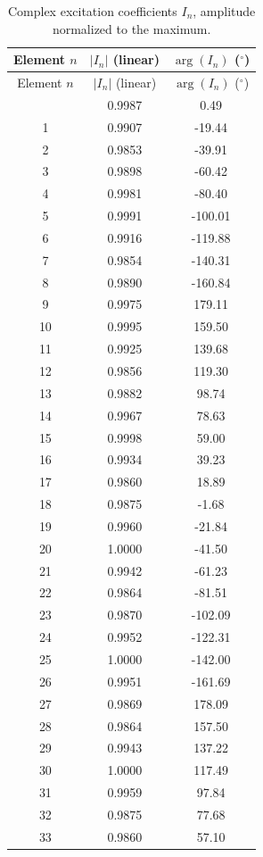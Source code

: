 \begin{longtable}{ccc}
\caption{Complex excitation coefficients $I_n$, amplitude normalized to the maximum.}\label{tab:I_vector}\\
\toprule
Element $n$ & $|I_n|$ (linear) & $\arg(I_n)$ ($^\circ$) \\
\midrule
\endfirsthead
\toprule
Element $n$ & $|I_n|$ (linear) & $\arg(I_n)$ ($^\circ$) \\
\midrule
\endhead
\bottomrule
\endfoot
0 & 0.9987 & 0.49 \\
1 & 0.9907 & -19.44 \\
2 & 0.9853 & -39.91 \\
3 & 0.9898 & -60.42 \\
4 & 0.9981 & -80.40 \\
5 & 0.9991 & -100.01 \\
6 & 0.9916 & -119.88 \\
7 & 0.9854 & -140.31 \\
8 & 0.9890 & -160.84 \\
9 & 0.9975 & 179.11 \\
10 & 0.9995 & 159.50 \\
11 & 0.9925 & 139.68 \\
12 & 0.9856 & 119.30 \\
13 & 0.9882 & 98.74 \\
14 & 0.9967 & 78.63 \\
15 & 0.9998 & 59.00 \\
16 & 0.9934 & 39.23 \\
17 & 0.9860 & 18.89 \\
18 & 0.9875 & -1.68 \\
19 & 0.9960 & -21.84 \\
20 & 1.0000 & -41.50 \\
21 & 0.9942 & -61.23 \\
22 & 0.9864 & -81.51 \\
23 & 0.9870 & -102.09 \\
24 & 0.9952 & -122.31 \\
25 & 1.0000 & -142.00 \\
26 & 0.9951 & -161.69 \\
27 & 0.9869 & 178.09 \\
28 & 0.9864 & 157.50 \\
29 & 0.9943 & 137.22 \\
30 & 1.0000 & 117.49 \\
31 & 0.9959 & 97.84 \\
32 & 0.9875 & 77.68 \\
33 & 0.9860 & 57.10 \\

\end{longtable}
